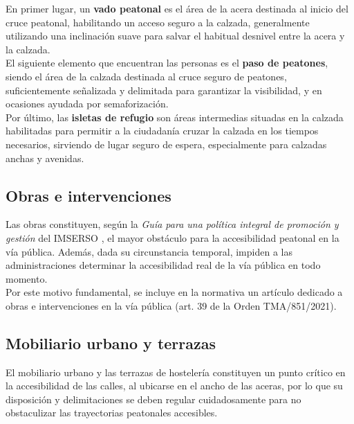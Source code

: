 En primer lugar, un \textbf{vado peatonal} es el área de la acera destinada al inicio del cruce peatonal, habilitando un acceso seguro a la calzada, generalmente utilizando una inclinación suave para salvar el habitual desnivel entre la acera y la calzada.
\\

El siguiente elemento que encuentran las personas es el \textbf{paso de peatones}, siendo el área de la calzada destinada al cruce seguro de peatones, suficientemente señalizada y delimitada para garantizar la visibilidad, y en ocasiones ayudada por semaforización.
\\

Por último, las \textbf{isletas de refugio} son áreas intermedias situadas en la calzada habilitadas para permitir a la ciudadanía cruzar la calzada en los tiempos necesarios, sirviendo de lugar seguro de espera, especialmente para calzadas anchas y avenidas.
\\

\subsection{Obras e intervenciones}
\label{subsec:obras}

Las obras constituyen, según la \textit{Guía para una política integral de promoción y gestión} del IMSERSO \parencite{sala_alonso_2012}, el mayor obstáculo para la accesibilidad peatonal en la vía pública. Además, dada su circunstancia temporal, impiden a las administraciones determinar la accesibilidad real de la vía pública en todo momento.
\\

Por este motivo fundamental, se incluye en la normativa un artículo dedicado a obras e intervenciones en la vía pública (art. 39 de la Orden TMA/851/2021).
\\

\subsection{Mobiliario urbano y terrazas}
\label{subsec:mobiliario}

El mobiliario urbano y las terrazas de hostelería constituyen un punto crítico en la accesibilidad de las calles, al ubicarse en el ancho de las aceras, por lo que su disposición y delimitaciones se deben regular cuidadosamente para no obstaculizar las trayectorias peatonales accesibles.
\\

